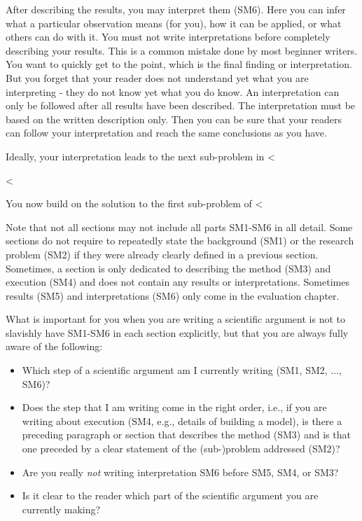 \documentclass[runningheads,a4paper,english]{llncs}[2018/03/10]
\begin{document}
{\textsf{After describing the results, you may interpret them (SM6).} Here you can infer what a particular observation means (for you), how it can be applied, or what others can do with it. You must not write interpretations before completely describing your results. This is a common mistake done by most beginner writers. You want to quickly get to the point, which is the final finding or interpretation. But you forget that your reader does not understand yet what you are interpreting - they do not know yet what you do know. An interpretation can only be followed after all results have been described. The interpretation must be based on the written description only. Then you can be sure that your readers can follow your interpretation and reach the same conclusions as you have.

Ideally, your interpretation leads to the next sub-problem in <%

<%

You now build on the solution to the first sub-problem of <%

Note that not all sections may not include all parts SM1-SM6 in all detail. Some sections do not require to repeatedly state the background (SM1) or the research problem (SM2) if they were already clearly defined in a previous section. Sometimes, a section is only dedicated to describing the method (SM3) and execution (SM4) and does not contain any results or interpretations. Sometimes results (SM5) and interpretations (SM6) only come in the evaluation chapter. 

What is important for you when you are writing a scientific argument is not to slavishly have SM1-SM6 in each section explicitly, but that you are always fully aware of the following:
%
\begin{itemize}
    \item Which step of a scientific argument am I currently writing (SM1, SM2, ..., SM6)?
    \item Does the step that I am writing come in the right order, i.e., if you are writing about execution (SM4, e.g., details of building a model), is there a preceding paragraph or section that describes the method (SM3) and is that one preceded by a clear statement of the (sub-)problem addressed (SM2)?
    \item Are you really \emph{not} writing interpretation SM6 before SM5, SM4, or SM3?
    \item Is it clear to the reader which part of the scientific argument you are currently making?
\end{itemize}

}
\end{document}
